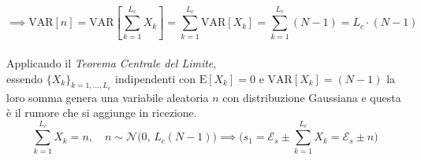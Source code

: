 \[
\implies \mathrm{VAR}[n] = \mathrm{VAR}\left[ \sum_{k=1}^{L_c}X_k \right] =
\sum_{k=1}^{L_c}\mathrm{VAR}\left[ X_k \right] = 
\sum_{k=1}^{L_c}\left( N-1 \right) = 
L_c \cdot (N-1)
\] \\
Applicando il \textit{Teorema Centrale del Limite},\\
essendo $\{X_k\}_{k=1,\dots,L_c}$
indipendenti con $\mathrm{E}[X_k]=0$ e $\mathrm{VAR}[X_k]=(N-1)$ la loro somma genera una variabile aleatoria $n$ con distribuzione Gaussiana e questa è il rumore che si aggiunge in ricezione.
\[
\sum_{k=1}^{L_c}X_k = n, \quad\boxed{ n\sim\mathcal{N}\Big(0,\, L_c(N-1)\Big) }
\implies \Bigg( s_1 = \mathcal{E}_s \pm \sum_{k=1}^{L_c}X_k = \mathcal{E}_s \pm n \Bigg)
\]